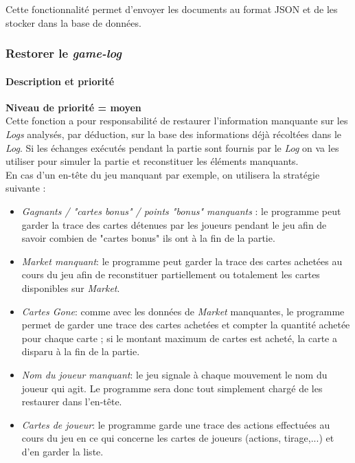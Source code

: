 Cette fonctionnalité permet d'envoyer les documents au format JSON et de les stocker dans la base de données. 



\subsubsection{Restorer le \textit{game-log}}
\paragraph*{Description et priorité}
\textbf{Niveau de priorité = moyen}\\

Cette fonction a pour responsabilité de restaurer l'information manquante sur les \textit{Logs} analysés, par déduction, sur la base des informations déjà récoltées dans le \textit{Log}. Si les échanges exécutés pendant la partie sont fournis par le \textit{Log} on va les utiliser pour simuler la partie et reconstituer les éléments manquants. \\

En cas d'un en-tête du jeu manquant par exemple, on utilisera la stratégie suivante :
  \begin{itemize}
\item \textit{Gagnants / "cartes bonus" / points "bonus" manquants }: le programme peut garder la trace des cartes détenues par les joueurs pendant le jeu afin de savoir combien de "cartes bonus" ils ont à la fin de la partie.
\item \textit\textit{{Market} manquant}: le programme peut garder la trace des cartes achetées au cours du jeu afin de reconstituer partiellement ou totalement les cartes disponibles sur \textit{Market}.
\item \textit{Cartes \textit{Gone}}: comme avec les données de \textit{Market} manquantes, le programme permet de garder une trace des cartes achetées et compter la quantité achetée pour chaque carte ; si le montant maximum de cartes est acheté, la carte a disparu à la fin de la partie.
\item \textit{Nom du joueur manquant}: le jeu signale à chaque mouvement le nom du joueur qui agit. Le programme sera donc tout simplement chargé de les restaurer dans l'en-tête.
\item \textit{Cartes de joueur}: le programme garde une trace des actions effectuées au cours du jeu en ce qui concerne les cartes de joueurs (actions, tirage,...) et d'en garder la liste.
  \end{itemize}

